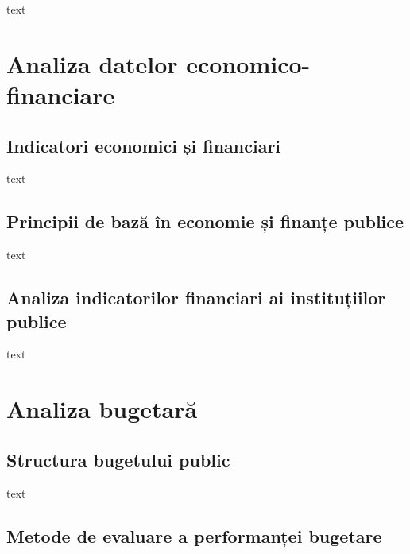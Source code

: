 \documentclass[
  11pt,
  b5paper,
  nottoc]{book}
\begin{document}
text


\hypertarget{cap3}{%
\chapter{Analiza datelor economico-financiare}\label{cap3}}

\hypertarget{indicatori-economici-ux219i-financiari}{%
\section{Indicatori economici și
financiari}\label{indicatori-economici-ux219i-financiari}}

text

\hypertarget{principii-de-bazux103-uxeen-economie-ux219i-finanux21be-publice}{%
\section{Principii de bază în economie și finanțe
publice}\label{principii-de-bazux103-uxeen-economie-ux219i-finanux21be-publice}}

text

\hypertarget{analiza-indicatorilor-financiari-ai-instituux21biilor-publice}{%
\section{Analiza indicatorilor financiari ai instituțiilor
publice}\label{analiza-indicatorilor-financiari-ai-instituux21biilor-publice}}

text


\hypertarget{cap4}{%
\chapter{Analiza bugetară}\label{cap4}}

\hypertarget{structura-bugetului-public}{%
\section{Structura bugetului public}\label{structura-bugetului-public}}

text

\hypertarget{metode-de-evaluare-a-performanux21bei-bugetare}{%
\section{Metode de evaluare a performanței
bugetare}\label{metode-de-evaluare-a-performanux21bei-bugetare}}
\end{document}
